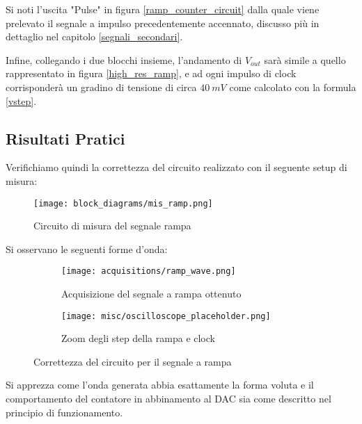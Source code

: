 Si noti l'uscita "Pulse" in figura \ref{ramp_counter_circuit} dalla quale viene prelevato
il segnale a impulso precedentemente accennato, discusso più in dettaglio nel capitolo
\ref{segnali_secondari}.

Infine, collegando i due blocchi insieme, l'andamento di $V_{out}$ sarà simile a quello
rappresentato in figura \ref{high_res_ramp}, e ad ogni impulso di clock corrisponderà un
gradino di tensione di circa $40\ mV$ come calcolato con la formula \ref{vstep}.


\subsection*{Risultati Pratici}


Verifichiamo quindi la correttezza del circuito realizzato con il seguente setup di misura:

\begin{figure}[H]
    \centering
    \texttt{[image: block\_diagrams/mis\_ramp.png]}
    \caption{Circuito di misura del segnale rampa}
    \label{mis_ramp}
\end{figure}

\vspace{2cm}

Si osservano le seguenti forme d'onda:

\begin{figure}[H]
    \centering

    \begin{subfigure}{.5\textwidth}
        \centering
        \texttt{[image: acquisitions/ramp\_wave.png]}
        \caption{Acquisizione del segnale a rampa ottenuto}
        \label{acq_ramp}
    \end{subfigure}%
    \begin{subfigure}{.5\textwidth}
        \centering
        \texttt{[image: misc/oscilloscope\_placeholder.png]}
        \caption{Zoom degli step della rampa e clock}
        \label{acq_ramp_steps}
    \end{subfigure}

    \caption{Correttezza del circuito per il segnale a rampa}
    \label{acq_ramp_signals}
\end{figure}

Si apprezza come l'onda generata abbia esattamente la forma voluta e il comportamento del
contatore in abbinamento al DAC sia come descritto nel principio di funzionamento.

